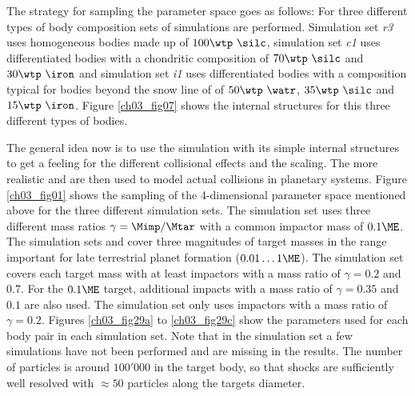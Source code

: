 The strategy for sampling the parameter space goes as follows: For three different types of body composition sets of simulations are performed. Simulation set \emph{r3} uses homogeneous bodies made up of $100 \wtp~\silc$, simulation set \emph{c1} uses differentiated bodies with a chondritic composition of $70 \wtp~\silc$ and $30 \wtp~\iron$ and simulation set \emph{i1} uses differentiated bodies with a composition typical for bodies beyond the snow line of of $50 \wtp~\watr$, $35 \wtp~\silc$ and $15 \wtp~\iron$. Figure \ref{ch03_fig07} shows the internal structures for this three different types of bodies.

The general idea now is to use the \rss simulation with its simple internal structures to get a feeling for the different collisional effects and the scaling. The more realistic \css and \iss are then used to model actual collisions in planetary systems. Figure \ref{ch03_fig01} shows the sampling of the 4-dimensional parameter space mentioned above for the three different simulation sets.  The \rss simulation set uses three different mass ratios $\gamma = \Mimp / \Mtar$ with a common impactor mass of $0.1 \ME$. The simulation sets \css and \iss cover three magnitudes of target masses in the range important for late terrestrial planet formation ($0.01 \dots 1 \ME$). The \css simulation set covers each target mass with at least impactors with a mass ratio of $\gamma = 0.2$ and  $0.7$. For the $0.1 \ME$ target, additional impacts with a mass ratio of $\gamma = 0.35$ and $0.1$ are also used. The \iss simulation set only uses impactors with a mass ratio of $\gamma = 0.2$. Figures \ref{ch03_fig29a} to \ref{ch03_fig29c} show the parameters used for each body pair in each simulation set. Note that in the \rss simulation set a few simulations have not been performed and are missing in the results. The number of particles is around $100'000$ in the target body, so that shocks are sufficiently well resolved with $\approx 50$ particles along the targets diameter.

